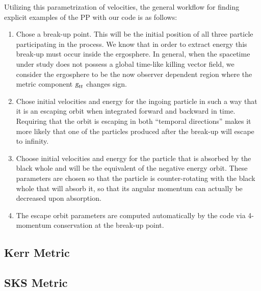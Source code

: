 Utilizing this parametrization of velocities, the general workflow for finding explicit examples of the PP with our code is as follows:

\begin{enumerate}
  \item Chose a break-up point. This will be the initial position of all three particle participating in the process. We know that in order to extract energy this break-up must occur inside the ergosphere. In general, when the spacetime under study does not possess a global time-like killing vector field, we consider the ergosphere to be the now observer dependent region where the metric component $\mtrtens{t}{t}$ changes sign.
  \item Chose initial velocities and energy for the ingoing particle in such a way that it is an escaping orbit when integrated forward and backward in time. Requiring that the orbit is escaping in both ``temporal directions'' makes it more likely that one of the particles produced after the break-up will escape to infinity.
  \item Choose initial velocities and energy for the particle that is absorbed by the black whole and will be the equivalent of the negative energy orbit. These parameters are chosen so that the particle is counter-rotating with the black whole that will absorb it, so that its angular momentum can actually be decreased upon absorption.
  \item The escape orbit parameters are computed automatically by the code via 4-momentum conservation at the break-up point.
\end{enumerate}

\subsection{Kerr Metric}
\label{ch:kerr_example}


\subsection{SKS Metric}
